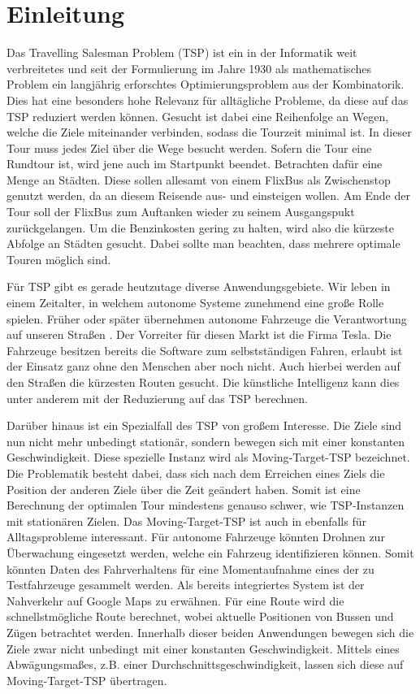 \documentclass[german,version-2019-11]{uzl-thesis}
\begin{document}
\chapter{Einleitung}

Das Travelling Salesman Problem (TSP) ist ein in der Informatik weit verbreitetes und seit der Formulierung im Jahre 1930 als mathematisches Problem ein langjährig erforschtes Optimierungsproblem aus der Kombinatorik. Dies hat eine besonders hohe Relevanz für alltägliche Probleme, da diese auf das TSP reduziert werden können. Gesucht ist dabei eine Reihenfolge an Wegen, welche die Ziele miteinander verbinden, sodass die Tourzeit minimal ist. In dieser Tour muss jedes Ziel über die Wege besucht werden. Sofern die Tour eine Rundtour ist, wird jene auch im Startpunkt beendet. Betrachten dafür eine Menge an Städten. Diese sollen allesamt von einem FlixBus als Zwischenstop genutzt werden, da an diesem Reisende aus- und einsteigen wollen. Am Ende der Tour soll der FlixBus zum Auftanken wieder zu seinem Ausgangspukt zurückgelangen. Um die Benzinkosten gering zu halten, wird also die kürzeste Abfolge an Städten gesucht. Dabei sollte man beachten, dass mehrere optimale Touren möglich sind. 

Für TSP gibt es gerade heutzutage diverse Anwendungsgebiete. Wir leben in einem Zeitalter, in welchem autonome Systeme zunehmend eine große Rolle spielen. Früher oder später übernehmen autonome Fahrzeuge die Verantwortung auf unseren Straßen \cite{minx2015autonomes}. Der Vorreiter für diesen Markt ist die Firma Tesla. Die Fahrzeuge besitzen bereits die Software zum selbstständigen Fahren, erlaubt ist der Einsatz ganz ohne den Menschen aber noch nicht. Auch hierbei werden auf den Straßen die kürzesten Routen gesucht. Die künstliche Intelligenz kann dies unter anderem mit der Reduzierung auf das TSP berechnen. 

Darüber hinaus ist ein Spezialfall des TSP von großem Interesse. Die Ziele sind nun nicht mehr unbedingt stationär, sondern bewegen sich mit einer konstanten Geschwindigkeit. Diese spezielle Instanz wird als Moving-Target-TSP bezeichnet. Die Problematik besteht dabei, dass sich nach dem Erreichen eines Ziels die Position der anderen Ziele über die Zeit geändert haben. Somit ist eine Berechnung der optimalen Tour mindestens genauso schwer, wie TSP-Instanzen mit stationären Zielen. Das Moving-Target-TSP ist auch in ebenfalls für Alltagsprobleme interessant. Für autonome Fahrzeuge könnten Drohnen zur Überwachung eingesetzt werden, welche ein Fahrzeug identifizieren können. Somit könnten Daten des Fahrverhaltens für eine Momentaufnahme eines der zu Testfahrzeuge gesammelt werden. Als bereits integriertes System ist der Nahverkehr auf Google Maps zu erwähnen. Für eine Route wird die schnellstmögliche Route berechnet, wobei aktuelle Positionen von Bussen und Zügen betrachtet werden. Innerhalb dieser beiden Anwendungen bewegen sich die Ziele zwar nicht unbedingt mit einer konstanten Geschwindigkeit. Mittels eines Abwägungsmaßes, z.B. einer Durchschnittsgeschwindigkeit, lassen sich diese auf Moving-Target-TSP übertragen. 
\end{document}
